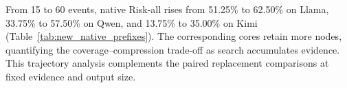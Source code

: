\begin{ablationadded}
From 15 to 60 events, native Risk-all rises from 51.25\% to 62.50\% on Llama, 33.75\% to 57.50\% on Qwen, and 13.75\% to 35.00\% on Kimi (Table~\ref{tab:new_native_prefixes}). The corresponding cores retain more nodes, quantifying the coverage--compression trade-off as search accumulates evidence. This trajectory analysis complements the paired replacement comparisons at fixed evidence and output size.

\end{ablationadded}
